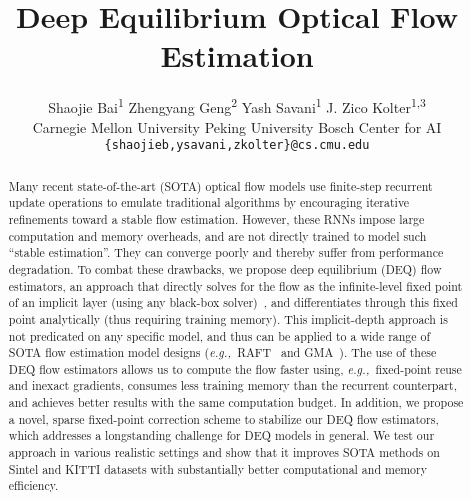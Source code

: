 \documentclass[10pt,twocolumn,letterpaper]{article}
\def\eg{\textit{e.g.,~}}
\begin{document}
\title{Deep Equilibrium Optical Flow Estimation}

\author{
    Shaojie Bai\textsuperscript{1}\footnotemark[1]
    \qquad
    Zhengyang Geng\textsuperscript{2}\footnotemark[1]
    \qquad
    Yash Savani\textsuperscript{1}
    \qquad
    J. Zico Kolter\textsuperscript{1,3}
    \\
    \quad Carnegie Mellon University \quad Peking University \quad Bosch Center for AI
    \\
    {\tt\small \{shaojieb,ysavani,zkolter\}@cs.cmu.edu} 
}

\maketitle


\begin{abstract}
    Many recent state-of-the-art (SOTA) optical flow models use finite-step recurrent update operations to emulate traditional algorithms by encouraging iterative refinements toward a stable flow estimation.
However, these RNNs impose large computation and memory overheads, and are not directly trained to model such ``stable estimation''. They can converge poorly and thereby suffer from performance degradation.
To combat these drawbacks, we propose deep equilibrium (DEQ) flow estimators, an approach that directly solves for the flow as the infinite-level fixed point of an implicit layer (using any black-box solver)~\cite{DEQ}, and differentiates through this fixed point analytically (thus requiring  training memory).
This implicit-depth approach is not predicated on any specific model, and thus can be applied to a wide range of SOTA flow estimation model designs (\eg RAFT~\cite{RAFT} and GMA~\cite{GMA}). 
The use of these DEQ flow estimators allows us to compute the flow faster using, \eg fixed-point reuse and inexact gradients, consumes  less training memory than the recurrent counterpart, and achieves better results with the same computation budget. 
In addition, we propose a novel, sparse fixed-point correction scheme to stabilize our DEQ flow estimators, which addresses a longstanding challenge for DEQ models in general.
We test our approach in various realistic settings and show that it improves SOTA methods on Sintel and KITTI datasets with substantially better computational and memory efficiency.
\end{abstract}

\renewcommand{\thefootnote}{\fnsymbol{footnote}}
\renewcommand*{\thefootnote}{\arabic{footnote}}
\end{document}
